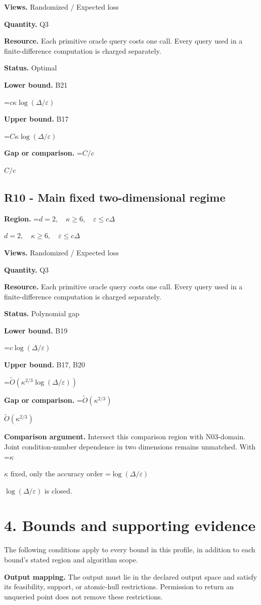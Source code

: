 \documentclass[10pt,a4paper]{article}
\newcommand{\AtlasMath}[1]{\par\begingroup\centering\setbox0=\hbox{$\displaystyle #1$}\ifdim\wd0>1.4\linewidth\typeout{ATLAS WIDE FORMULA: \the\wd0}\fi\ifdim\wd0>\linewidth\resizebox{\linewidth}{!}{\box0}\else\box0\fi\par\endgroup}
\newcommand{\AtlasInlineMath}[1]{\begingroup\setbox0=\hbox{$#1$}\ifdim\wd0>.4\linewidth\endgroup\AtlasMath{#1}\else\endgroup$#1$\fi}
\begin{document}
\textbf{Views.} Randomized / Expected loss

\textbf{Quantity.} Q3

\textbf{Resource.} Each primitive oracle query costs one call. Every query used in a finite-difference computation is charged separately.

\textbf{Status.} Optimal

\textbf{Lower bound.} B21

\AtlasMath{c\kappa\log(\Delta/\varepsilon)}
\textbf{Upper bound.} B17

\AtlasMath{C\kappa\log(\Delta/\varepsilon)}
\textbf{Gap or comparison.} \AtlasInlineMath{C/c}

\subsection{R10 - Main fixed two-dimensional regime}
\textbf{Region.} \AtlasInlineMath{d=2,\quad\kappa\ge6,\quad\varepsilon\le c\Delta}

\textbf{Views.} Randomized / Expected loss

\textbf{Quantity.} Q3

\textbf{Resource.} Each primitive oracle query costs one call. Every query used in a finite-difference computation is charged separately.

\textbf{Status.} Polynomial gap

\textbf{Lower bound.} B19

\AtlasMath{c\log(\Delta/\varepsilon)}
\textbf{Upper bound.} B17, B20

\AtlasMath{\widetilde{O}(\kappa^{2/3}\log(\Delta/\varepsilon))}
\textbf{Gap or comparison.} \AtlasInlineMath{\widetilde{O}(\kappa^{2/3})}

\textbf{Comparison argument.} Intersect this comparison region with N03-domain. Joint condition-number dependence in two dimensions remains unmatched. With \AtlasInlineMath{\kappa} fixed, only the accuracy order \AtlasInlineMath{\log(\Delta/\varepsilon)} is closed.

\section{4. Bounds and supporting evidence}
The following conditions apply to every bound in this profile, in addition to each bound's stated region and algorithm scope.

\textbf{Output mapping.} The output must lie in the declared output space and satisfy its feasibility, support, or atomic-hull restrictions. Permission to return an unqueried point does not remove these restrictions.
\end{document}
